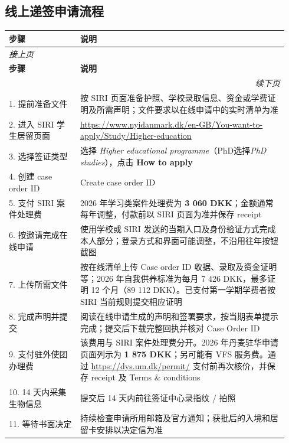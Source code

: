 \subsection{线上递签申请流程}

\noindent
\scriptsize
{}           %
\renewcommand{\arraystretch}{1.2}       %
\begin{longtable}{p{0.24\linewidth}p{0.70\linewidth}}
  \toprule
  \rowcolor{gray!10} %
  \textbf{步骤} & \textbf{说明} \\ 
  \midrule
  \endfirsthead

  \multicolumn{2}{l}{\textit{接上页}}\\
  \toprule
  \textbf{步骤} & \textbf{说明} \\ 
  \midrule
  \endhead

  \midrule\multicolumn{2}{r}{\textit{续下页}}\\
  \bottomrule
  \endfoot

  \bottomrule
  \endlastfoot

  1. 提前准备文件 & 按 SIRI 页面准备护照、学校录取信息、资金或学费证明及所需声明；文件要求以在线申请中的实时清单为准 \\
  2. 进入 SIRI 学生居留页面 & \url{https://www.nyidanmark.dk/en-GB/You-want-to-apply/Study/Higher-education} \\
  3. 选择签证类型 & 选择 \emph{Higher educational programme}（PhD选择\emph{PhD studies}），点击 \textbf{How to apply} \\
  4. 创建 case order ID & Create case order ID \\
  5. 支付 SIRI 案件处理费 & 2026 年学习类案件处理费为 \textbf{3 060 DKK}；金额通常每年调整，付款前以 SIRI 页面为准并保存 receipt \\
  6. 按邀请完成在线申请 & 使用学校或 SIRI 发送的当期入口及身份验证方式完成本人部分；登录方式和界面可能调整，不沿用往年按钮截图 \\
  7. 上传所需文件 & 按在线清单上传 Case order ID 收据、录取及资金证明等；2026 年自我供养标准为每月 7 426 DKK，最多证明 12 个月（89 112 DKK）。已支付第一学期学费者按 SIRI 当前规则提交相应证明 \\
  8. 完成声明并提交 & 阅读在线申请生成的声明和签署要求，按当期表单提示完成；提交后下载完整回执并核对 Case Order ID \\
  9. 支付驻外使团办理费 & 该费用与 SIRI 案件处理费分开。2026 年丹麦驻华申请页面列示为 \textbf{1 875 DKK}；另可能有 VFS 服务费。通过 \url{https://dys.um.dk/permit/} 支付前再次核价，并保存 receipt 及 Terms \& conditions \\
  10. 14 天内采集生物信息 & 提交后 14 天内前往签证中心录指纹 / 拍照 \\
  11. 等待书面决定 & 持续检查申请所用邮箱及官方通知；获批后的入境和居留卡安排以决定信为准 \\

\end{longtable}
\normalsize


